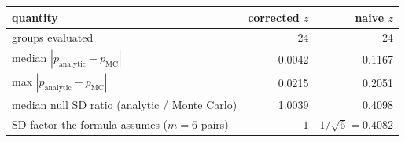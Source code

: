 \small
\begin{tabular}{lrr}
\toprule
quantity & corrected $z$ & naive $z$ \\
\midrule
groups evaluated & 24 & 24 \\
median $|p_{\mathrm{analytic}} - p_{\mathrm{MC}}|$ & 0.0042 & 0.1167 \\
max $|p_{\mathrm{analytic}} - p_{\mathrm{MC}}|$ & 0.0215 & 0.2051 \\
median null SD ratio (analytic / Monte Carlo) & 1.0039 & 0.4098 \\
SD factor the formula assumes ($m=6$ pairs) & $1$ & $1/\sqrt{6} = 0.4082$ \\
\bottomrule
\end{tabular}